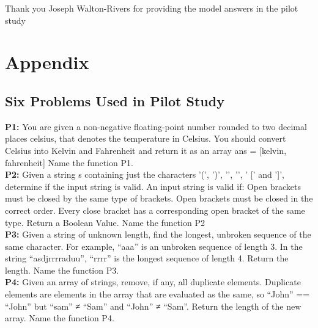 \documentclass[manuscript,screen,review,sigconf]{acmart}
\begin{document}
\begin{acks}
Thank you Joseph Walton-Rivers for providing the model answers in the pilot study
\end{acks}




\section{Appendix}

\subsection{Six Problems Used in Pilot Study}

\textbf{P1:} You are given a non-negative floating-point number rounded to two decimal places celsius, that denotes the temperature in Celsius. You should convert Celsius into Kelvin and Fahrenheit and return it as an array ans = [kelvin, fahrenheit] Name the function P1.\\

\textbf{P2:} Given a string s containing just the characters '(', ')', '{', '}', ' [' and ']', determine if the input string is valid. An input string is valid if: Open brackets must be closed by the same type of brackets. Open brackets must be closed in the correct order. Every close bracket has a corresponding open bracket of the same type. Return a Boolean Value. Name the function P2\\

\textbf{P3:} Given a string of unknown length, find the longest, unbroken sequence of the same character. For example, “aaa” is an unbroken sequence of length 3. In the string “asdjrrrraduu”, “rrrr” is the longest sequence of length 4. Return the length. Name the function P3.\\

\textbf{P4:} Given an array of strings, remove, if any, all duplicate elements. Duplicate elements are elements in the array that are evaluated as the same, so “John” == “John” but “sam” ≠ “Sam” and “John” ≠ “Sam”. Return the length of the new array. Name the function P4.\\
\end{document}
